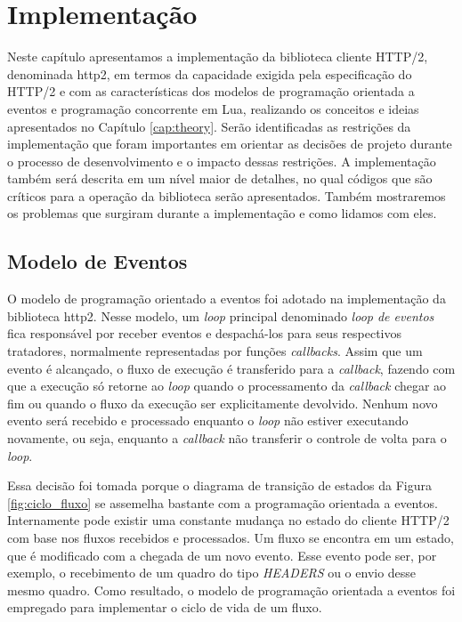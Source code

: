 \chapter{Implementação}
\label{cap:implementation}

Neste capítulo apresentamos a implementação da biblioteca cliente HTTP/2, denominada http2, em termos da capacidade exigida pela especificação do HTTP/2 e com as características dos modelos de programação orientada a eventos e programação concorrente em Lua, realizando os conceitos e ideias apresentados no Capítulo \ref{cap:theory}. Serão identificadas as restrições da implementação que foram importantes em orientar as decisões de projeto durante o processo de desenvolvimento e o impacto dessas restrições. A implementação também será descrita em um nível maior de detalhes, no qual códigos que são críticos para a operação da biblioteca serão apresentados. Também mostraremos os problemas que surgiram durante a implementação e como lidamos com eles.

\section{Modelo de Eventos}
\label{cap:events}

O modelo de programação orientado a eventos foi adotado na implementação da biblioteca http2. Nesse modelo, um {\em loop} principal denominado {\em loop de eventos} fica responsável por receber eventos e despachá-los para seus respectivos tratadores, normalmente representadas por funções {\em callbacks}. Assim que um evento é alcançado, o fluxo de execução é transferido para a {\em callback}, fazendo com que a execução só retorne ao {\em loop} quando o processamento da {\em callback} chegar ao fim ou quando o fluxo da execução ser explicitamente devolvido. Nenhum novo evento será recebido e processado enquanto o {\em loop} não estiver executando novamente, ou seja, enquanto a {\em callback} não transferir o controle de volta para o {\em loop}.

Essa decisão foi tomada porque o diagrama de transição de estados da Figura \ref{fig:ciclo_fluxo} se assemelha bastante com a programação orientada a eventos. Internamente pode existir uma constante mudança no estado do cliente HTTP/2 com base nos fluxos recebidos e processados. Um fluxo se encontra em um estado, que é modificado com a chegada de um novo evento. Esse evento pode ser, por exemplo, o recebimento de um quadro do tipo {\em HEADERS} ou o envio desse mesmo quadro. Como resultado, o modelo de programação orientada a eventos foi empregado para implementar o ciclo de vida de um fluxo.

